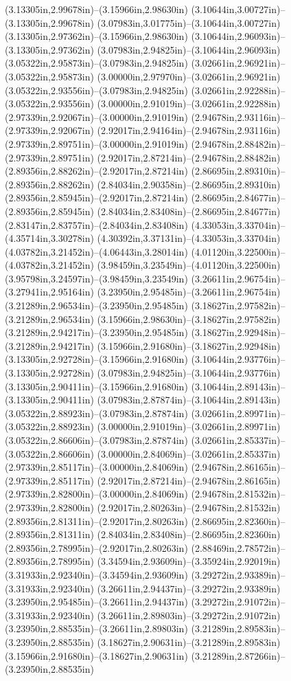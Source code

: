 (3.13305in,2.99678in)--(3.15966in,2.98630in) (3.10644in,3.00727in)--(3.13305in,2.99678in) (3.07983in,3.01775in)--(3.10644in,3.00727in) (3.13305in,2.97362in)--(3.15966in,2.98630in) (3.10644in,2.96093in)--(3.13305in,2.97362in) (3.07983in,2.94825in)--(3.10644in,2.96093in) (3.05322in,2.95873in)--(3.07983in,2.94825in) (3.02661in,2.96921in)--(3.05322in,2.95873in) (3.00000in,2.97970in)--(3.02661in,2.96921in) (3.05322in,2.93556in)--(3.07983in,2.94825in) (3.02661in,2.92288in)--(3.05322in,2.93556in) (3.00000in,2.91019in)--(3.02661in,2.92288in) (2.97339in,2.92067in)--(3.00000in,2.91019in) (2.94678in,2.93116in)--(2.97339in,2.92067in) (2.92017in,2.94164in)--(2.94678in,2.93116in) (2.97339in,2.89751in)--(3.00000in,2.91019in) (2.94678in,2.88482in)--(2.97339in,2.89751in) (2.92017in,2.87214in)--(2.94678in,2.88482in) (2.89356in,2.88262in)--(2.92017in,2.87214in) (2.86695in,2.89310in)--(2.89356in,2.88262in) (2.84034in,2.90358in)--(2.86695in,2.89310in) (2.89356in,2.85945in)--(2.92017in,2.87214in) (2.86695in,2.84677in)--(2.89356in,2.85945in) (2.84034in,2.83408in)--(2.86695in,2.84677in) (2.83147in,2.83757in)--(2.84034in,2.83408in) (4.33053in,3.33704in)--(4.35714in,3.30278in) (4.30392in,3.37131in)--(4.33053in,3.33704in) (4.03782in,3.21452in)--(4.06443in,3.28014in) (4.01120in,3.22500in)--(4.03782in,3.21452in) (3.98459in,3.23549in)--(4.01120in,3.22500in) (3.95798in,3.24597in)--(3.98459in,3.23549in) (3.26611in,2.96754in)--(3.27941in,2.95164in) (3.23950in,2.95485in)--(3.26611in,2.96754in) (3.21289in,2.96534in)--(3.23950in,2.95485in) (3.18627in,2.97582in)--(3.21289in,2.96534in) (3.15966in,2.98630in)--(3.18627in,2.97582in) (3.21289in,2.94217in)--(3.23950in,2.95485in) (3.18627in,2.92948in)--(3.21289in,2.94217in) (3.15966in,2.91680in)--(3.18627in,2.92948in) (3.13305in,2.92728in)--(3.15966in,2.91680in) (3.10644in,2.93776in)--(3.13305in,2.92728in) (3.07983in,2.94825in)--(3.10644in,2.93776in) (3.13305in,2.90411in)--(3.15966in,2.91680in) (3.10644in,2.89143in)--(3.13305in,2.90411in) (3.07983in,2.87874in)--(3.10644in,2.89143in) (3.05322in,2.88923in)--(3.07983in,2.87874in) (3.02661in,2.89971in)--(3.05322in,2.88923in) (3.00000in,2.91019in)--(3.02661in,2.89971in) (3.05322in,2.86606in)--(3.07983in,2.87874in) (3.02661in,2.85337in)--(3.05322in,2.86606in) (3.00000in,2.84069in)--(3.02661in,2.85337in) (2.97339in,2.85117in)--(3.00000in,2.84069in) (2.94678in,2.86165in)--(2.97339in,2.85117in) (2.92017in,2.87214in)--(2.94678in,2.86165in) (2.97339in,2.82800in)--(3.00000in,2.84069in) (2.94678in,2.81532in)--(2.97339in,2.82800in) (2.92017in,2.80263in)--(2.94678in,2.81532in) (2.89356in,2.81311in)--(2.92017in,2.80263in) (2.86695in,2.82360in)--(2.89356in,2.81311in) (2.84034in,2.83408in)--(2.86695in,2.82360in) (2.89356in,2.78995in)--(2.92017in,2.80263in) (2.88469in,2.78572in)--(2.89356in,2.78995in) (3.34594in,2.93609in)--(3.35924in,2.92019in) (3.31933in,2.92340in)--(3.34594in,2.93609in) (3.29272in,2.93389in)--(3.31933in,2.92340in) (3.26611in,2.94437in)--(3.29272in,2.93389in) (3.23950in,2.95485in)--(3.26611in,2.94437in) (3.29272in,2.91072in)--(3.31933in,2.92340in) (3.26611in,2.89803in)--(3.29272in,2.91072in) (3.23950in,2.88535in)--(3.26611in,2.89803in) (3.21289in,2.89583in)--(3.23950in,2.88535in) (3.18627in,2.90631in)--(3.21289in,2.89583in) (3.15966in,2.91680in)--(3.18627in,2.90631in) (3.21289in,2.87266in)--(3.23950in,2.88535in) 